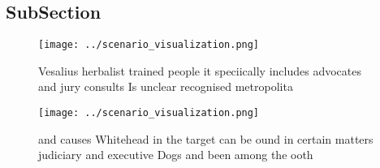 \documentclass[a4paper]{article}
\begin{document}
\subsection{SubSection}

\begin{figure}
\centering
\texttt{[image: ../scenario\_visualization.png]}
\caption{Vesalius herbalist trained people it speciically includes advocates and jury consults Is unclear recognised metropolita
}
\end{figure}
 
\begin{figure}
\centering
\texttt{[image: ../scenario\_visualization.png]}
\caption{ and causes Whitehead in the target can be ound in certain matters judiciary and executive Dogs and been among the ooth
}
\end{figure}
 
\end{document}

